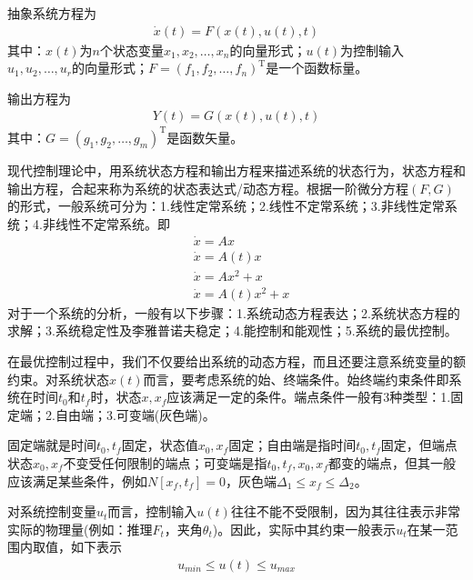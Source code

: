             \par
            抽象系统方程为
            \begin{align*}
            \dot{x}(t) = F(x(t),u(t),t)
            \end{align*}
            其中：$x(t)$为$n$个状态变量$x_1,x_2,\dots,x_n$的向量形式；$u(t)$为控制输入$u_1,u_2,\dots,u_r$的向量形式；$F=(f_1,f_2,\dots,f_n)^\mathrm{T}$是一个函数标量。
            \par
            输出方程为
            \begin{align*}
            Y(t) = G(x(t),u(t),t)
            \end{align*}
            其中：$G=(g_1,g_2,\dots,g_m)^\mathrm{T}$是函数矢量。
            \par
            现代控制理论中，用系统状态方程和输出方程来描述系统的状态行为，状态方程和输出方程，合起来称为系统的状态表达式/动态方程。根据一阶微分方程$(F,G)$的形式，一般系统可分为：1.线性定常系统；2.线性不定常系统；3.非线性定常系统；4.非线性不定常系统。即
            \begin{align*}
            & \dot{x} = A x\\
            & \dot{x} = A(t)x\\
            & \dot{x} = Ax^2+x\\
            & \dot{x} = A(t)x^2+x
            \end{align*}
            对于一个系统的分析，一般有以下步骤：1.系统动态方程表达；2.系统状态方程的求解；3.系统稳定性及李雅普诺夫稳定；4.能控制和能观性；5.系统的最优控制。
            \par
            在最优控制过程中，我们不仅要给出系统的动态方程，而且还要注意系统变量的额约束。对系统状态$x(t)$而言，要考虑系统的始、终端条件。始终端约束条件即系统在时间$t_0$和$t_f$时，状态$x,x_f$应该满足一定的条件。端点条件一般有3种类型：1.固定端；2.自由端；3.可变端(灰色端)。
            \par
            固定端就是时间$t_0,t_f$固定，状态值$x_0,x_f$固定；自由端是指时间$t_0,t_f$固定，但端点状态$x_0,x_f$不变受任何限制的端点；可变端是指$t_0,t_f,x_0,x_f$都变的端点，但其一般应该满足某些条件，例如$N[x_f,t_f] = 0$，灰色端$\Delta_1 \leqslant x_f \leqslant \Delta_2$。
            \par
            对系统控制变量$u_t$而言，控制输入$u(t)$往往不能不受限制，因为其往往表示非常实际的物理量(例如：推理$F_t$，夹角$\theta_t$)。因此，实际中其约束一般表示$u_t$在某一范围内取值，如下表示
            \begin{align*}
            u_{min}  \leqslant u(t) \leqslant u_{max}
            \end{align*}
